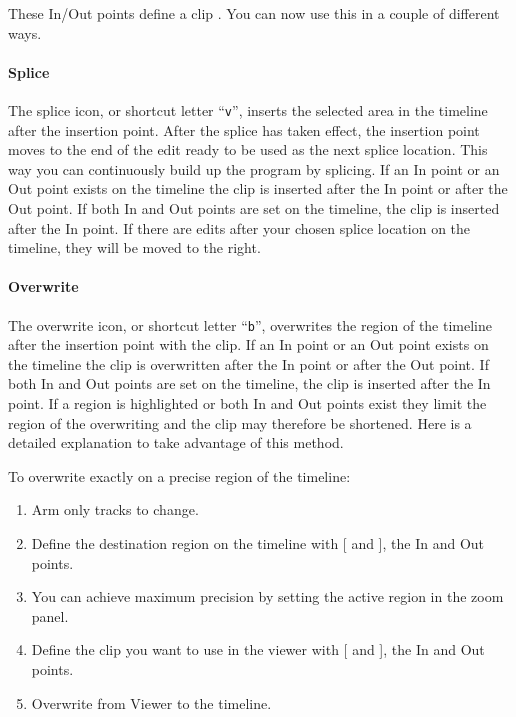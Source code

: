 These In/Out points define a clip .  You can now use this in a couple
of different ways.

\paragraph{Splice}  The splice icon, or shortcut letter “\texttt{v}”,
inserts the selected area in the timeline after the insertion point.
After the splice has taken effect, the insertion point moves to the
end of the edit ready to be used as the next splice location. This
way you can continuously build up the program by splicing.  If an In
point or an Out point exists on the timeline the clip is inserted
after the In point or after the Out point. If both In and Out points
are set on the timeline, the clip is inserted after the In point. If
there are edits after your chosen splice location on the timeline,
they will be moved to the right.

\paragraph{Overwrite}  The overwrite icon, or shortcut letter
“\texttt{b}”, overwrites the region of the timeline after the
insertion point with the clip. If an In point or an Out point exists
on the timeline the clip is overwritten after the In point or after
the Out point. If both In and Out points are set on the timeline,
the clip is inserted after the In point. If a region is highlighted
or both In and Out points exist they limit the region of the
overwriting and the clip may therefore be shortened. Here is a
detailed explanation to take advantage of this method.

To overwrite exactly on a precise region of the timeline:

\begin{enumerate} [noitemsep]
\item Arm only tracks to change.
\item Define the destination region on the timeline with [ and
  ], the In and Out points.
\item You can achieve maximum precision by setting the active
  region in the zoom panel.
\item Define the clip you want to use in the viewer with [ and
  ], the In and Out points.
\item Overwrite from Viewer to the timeline.
\end{enumerate}

